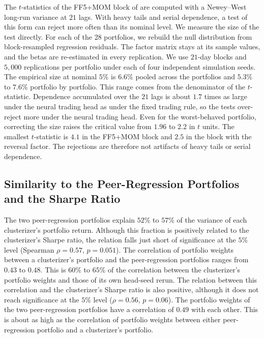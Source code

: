 The $t$-statistics of the FF5+MOM block of  are computed with a Newey--West long-run variance at $21$ lags. With heavy tails and serial dependence, a test of this form can reject more often than its nominal level. We measure the size of the test directly. For each of the 28 portfolios, we rebuild the null distribution from block-resampled regression residuals. The factor matrix stays at its sample values, and the betas are re-estimated in every replication. We use $21$-day blocks and $5{,}000$ replications per portfolio under each of four independent simulation seeds. The empirical size at nominal $5\%$ is $6.6\%$ pooled across the portfolios and $5.3\%$ to $7.6\%$ portfolio by portfolio. This range comes from the denominator of the $t$-statistic. Dependence accumulated over the $21$ lags is about $1.7$ times as large under the neural trading head as under the fixed trading rule, so the tests over-reject more under the neural trading head. Even for the worst-behaved portfolio, correcting the size raises the critical value from $1.96$ to $2.2$ in $t$ units. The smallest $t$-statistic is $4.1$ in the FF5+MOM block and $2.5$ in the block with the reversal factor. The rejections are therefore not artifacts of heavy tails or serial dependence.

\subsection{Similarity to the Peer-Regression Portfolios and the Sharpe Ratio}
\label{app:peerdist}

The two peer-regression portfolios explain $52\%$ to $57\%$ of the variance of each clusterizer's portfolio return. Although this fraction is positively related to the clusterizer's Sharpe ratio, the relation falls just short of significance at the $5\%$ level (Spearman $\rho = 0.57$, $p = 0.051$). The correlation of portfolio weights between a clusterizer's portfolio and the peer-regression portfolios ranges from $0.43$ to $0.48$. This is $60\%$ to $65\%$ of the correlation between the clusterizer's portfolio weights and those of its own head-seed rerun. The relation between this correlation and the clusterizer's Sharpe ratio is also positive, although it does not reach significance at the $5\%$ level ($\rho = 0.56$, $p = 0.06$). The portfolio weights of the two peer-regression portfolios have a correlation of $0.49$ with each other. This is about as high as the correlation of portfolio weights between either peer-regression portfolio and a clusterizer's portfolio.

